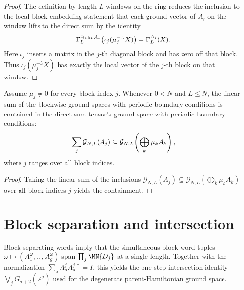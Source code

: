 \begin{proof}
    \leanok
    The definition by length-$L$ windows on the ring reduces the inclusion to
    the local block-embedding statement that each ground vector of $A_j$ on the
    window lifts to the direct sum by the identity
    \begin{align}
        \Gamma_L^{\oplus_k\mu_k A_k}
        \!\left(\iota_j(\mu_j^{-L}X)\right)
         & =
        \Gamma_L^{A_j}(X).
        \notag
    \end{align}
    Here $\iota_j$ inserts a matrix in the $j$-th diagonal block and has zero
    off that block. Thus $\iota_j(\mu_j^{-L}X)$ has exactly the local vector of
    the $j$-th block on that window.
\end{proof}

\begin{lemma}
    \label{lem:isup_chain_ground_space_block_le_assembled}
    \leanok
    Assume $\mu_j\neq0$ for every block index $j$. Whenever $0<N$ and
    $L\le N$, the linear sum of the blockwise ground spaces with periodic
    boundary conditions is contained in the direct-sum tensor's ground space
    with periodic boundary conditions:
    \begin{align}
        \sum_j \mathcal G_{N,L}(A_j)
         & \subseteq
        \mathcal G_{N,L}\!\left(\bigoplus_k \mu_k A_k\right),
        \notag
    \end{align}
    where $j$ ranges over all block indices.
\end{lemma}

\begin{proof}
    \leanok
    Taking the linear sum of the inclusions
    $\mathcal G_{N,L}(A_j)
        \subseteq\mathcal G_{N,L}(\bigoplus_k \mu_k A_k)$
    over all block indices $j$ yields the containment.
\end{proof}


\section{Block separation and intersection}\label{sec:block_separation_intersection}

Block-separating words imply that the simultaneous block-word tuples
$\omega\mapsto(A_1^\omega,\ldots,A_g^\omega)$ span $\prod_j\MN{D_j}$ at a single
length. Together with the normalization $\sum_a A^j_aA^{j\,\dagger}_a=I$,
this yields the one-step intersection identity $\bigvee_jG_{n+2}(A^j)$ used for
the degenerate parent-Hamiltonian ground space.



